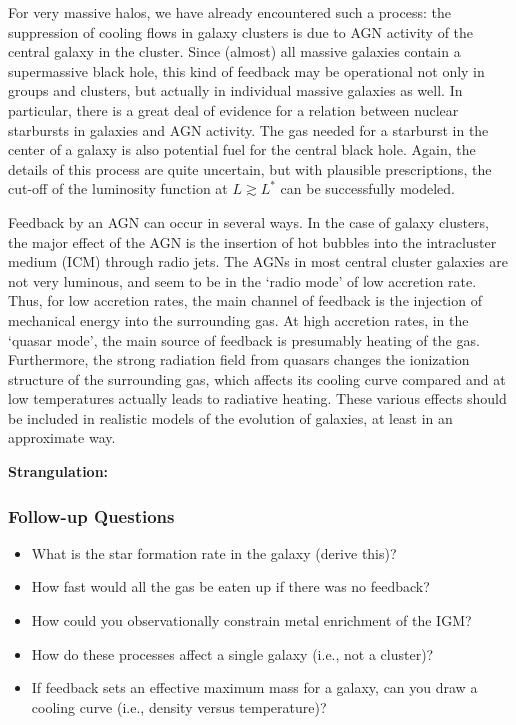\documentclass[a4paper,11pt]{article}
\begin{document}
{\noindent}For very massive halos, we have already encountered such a process: the suppression of cooling flows in galaxy clusters is due to AGN activity of the central galaxy in the cluster. Since (almost) all massive galaxies contain a supermassive black hole, this kind of feedback may be operational not only in groups and clusters, but actually in individual massive galaxies as well. In particular, there is a great deal of evidence for a relation between nuclear starbursts in galaxies and AGN activity. The gas needed for a starburst in the center of a galaxy is also potential fuel for the central black hole. Again, the details of this process are quite uncertain, but with plausible prescriptions, the cut-off of the luminosity function at $L\gtrsim L^*$ can be successfully modeled.

{\noindent}Feedback by an AGN can occur in several ways. In the case of galaxy clusters, the major effect of the AGN is the insertion of hot bubbles into the intracluster medium (ICM) through radio jets. The AGNs in most central cluster galaxies are not very luminous, and seem to be in the `radio mode' of low accretion rate. Thus, for low accretion rates, the main channel of feedback is the injection of mechanical energy into the surrounding gas. At high accretion rates, in the `quasar mode', the main source of feedback is presumably heating of the gas. Furthermore, the strong radiation field from quasars changes the ionization structure of the surrounding gas, which affects its cooling curve compared and at low temperatures actually leads to radiative heating. These various effects should be included in realistic models of the evolution of galaxies, at least in an approximate way.

{\noindent}\textbf{Strangulation:}

\subsubsection{Follow-up Questions}

\begin{itemize}
    \item What is the star formation rate in the galaxy (derive this)? 
    \item How fast would all the gas be eaten up if there was no feedback?
    \item How could you observationally constrain metal enrichment of the IGM?
    \item How do these processes affect a single galaxy (i.e., not a cluster)?
    \item If feedback sets an effective maximum mass for a galaxy, can you draw a cooling curve (i.e., density versus temperature)? 
\end{itemize}
\end{document}
